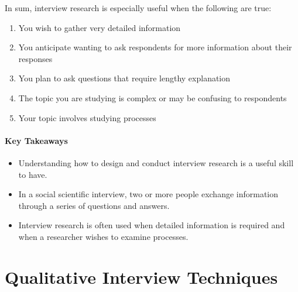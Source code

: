 In sum, interview research is especially useful when the following are true:

\begin{enumerate}
	\item You wish to gather very detailed information
	\item You anticipate wanting to ask respondents for more information about their responses
	\item You plan to ask questions that require lengthy explanation
	\item The topic you are studying is complex or may be confusing to respondents
	\item Your topic involves studying processes
\end{enumerate}

\paragraph{Key Takeaways}

\begin{itemize}
	\setlength{\itemsep}{0pt}
	\setlength{\parskip}{0pt}
	\setlength{\parsep}{0pt}
	
	\item Understanding how to design and conduct interview research is a useful skill to have.
	\item In a social scientific interview, two or more people exchange information through a series of questions and answers.
	\item Interview research is often used when detailed information is required and when a researcher wishes to examine processes.
	
\end{itemize}

\section{Qualitative Interview Techniques}

